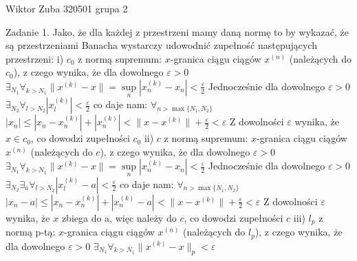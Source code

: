 \documentclass{article}
\begin{document}
Wiktor Zuba 320501 grupa 2
\newline

Zadanie 1.
\newline
\newline
Jako, że dla każdej z przestrzeni mamy daną normę to by wykazać, że są przestrzeniami Banacha\newline
wystarczy udowodnić zupełność następujących przestrzeni:\newline
i) $c_0$ z normą supremum:\newline
$x$-granica ciągu ciągów $x^{(n)}$ (należących do $c_0$), z czego wynika,\newline
że dla dowolnego $\varepsilon>0$ $\exists_{N_1}\forall_{k>N_1} \lVert x^{(k)}-x\rVert=\sup\limits_{n}|x^{(k)}_n-x_n|<\frac{\varepsilon}{2}$\newline
Jednocześnie dla dowolnego $\varepsilon>0$ $\exists_{N_2}\forall_{l>N_2} |x^{(k)}_l|<\frac{\varepsilon}{2}$ co daje nam:\newline
$\forall_{n>\max\{N_1,N_2\}}$ $|x_n|\le|x_n-x^{(k)}_n|+|x^{(k)}_n|<\lVert x-x^{(k)}\rVert+\frac{\varepsilon}{2}<\varepsilon$\newline
Z dowolności $\varepsilon$ wynika, że $x\in c_0$, co dowodzi zupełności $c_0$\newline\newline
ii) $c$ z normą supremum:\newline 
$x$-granica ciągu ciągów $x^{(n)}$ (należących do $c$), z czego wynika,\newline
że dla dowolnego $\varepsilon>0$ $\exists_{N_1}\forall_{k>N_1} \lVert x^{(k)}-x\rVert=\sup\limits_{n}|x^{(k)}_n-x_n|<\frac{\varepsilon}{2}$\newline
Jednocześnie dla dowolnego $\varepsilon>0$ $\exists_{N_2}\exists_{a}\forall_{l>N_2} |x^{(k)}_l-a|<\frac{\varepsilon}{2}$ co daje nam:\newline
$\forall_{n>\max\{N_1,N_2\}}$ $|x_n-a|\le|x_n-x^{(k)}_n|+|x^{(k)}_n-a|<\lVert x-x^{(k)}\rVert+\frac{\varepsilon}{2}<\varepsilon$\newline
Z dowolności $\varepsilon$ wynika, że $x$ zbiega do a, więc należy do $c$, co dowodzi zupełności $c$\newline\newline
iii) $l_p$ z normą p-tą:\newline
$x$-granica ciągu ciągów $x^{(n)}$ (należących do $l_p$), z czego wynika,\newline
że dla dowolnego $\varepsilon>0$ $\exists_{N_1}\forall_{k>N_1} \lVert x^{(k)}-x\rVert_p<\varepsilon$\newline
\end{document}
